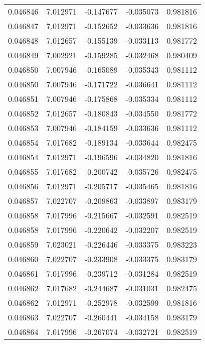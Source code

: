 \begin{tabular}{lrrrr}
0.046846    &  7.012971 & -0.147677 & -0.035073 &             0.981816 \\
0.046847    &  7.012971 & -0.152652 & -0.033636 &             0.981816 \\
0.046848    &  7.012657 & -0.155139 & -0.033113 &             0.981772 \\
0.046849    &  7.002921 & -0.159285 & -0.032468 &             0.980409 \\
0.046850    &  7.007946 & -0.165089 & -0.035343 &             0.981112 \\
0.046850    &  7.007946 & -0.171722 & -0.036641 &             0.981112 \\
0.046851    &  7.007946 & -0.175868 & -0.035334 &             0.981112 \\
0.046852    &  7.012657 & -0.180843 & -0.034550 &             0.981772 \\
0.046853    &  7.007946 & -0.184159 & -0.033636 &             0.981112 \\
0.046854    &  7.017682 & -0.189134 & -0.033644 &             0.982475 \\
0.046854    &  7.012971 & -0.196596 & -0.034820 &             0.981816 \\
0.046855    &  7.017682 & -0.200742 & -0.035726 &             0.982475 \\
0.046856    &  7.012971 & -0.205717 & -0.035465 &             0.981816 \\
0.046857    &  7.022707 & -0.209863 & -0.033897 &             0.983179 \\
0.046858    &  7.017996 & -0.215667 & -0.032591 &             0.982519 \\
0.046858    &  7.017996 & -0.220642 & -0.032207 &             0.982519 \\
0.046859    &  7.023021 & -0.226446 & -0.033375 &             0.983223 \\
0.046860    &  7.022707 & -0.233908 & -0.033375 &             0.983179 \\
0.046861    &  7.017996 & -0.239712 & -0.031284 &             0.982519 \\
0.046862    &  7.017682 & -0.244687 & -0.031031 &             0.982475 \\
0.046862    &  7.012971 & -0.252978 & -0.032599 &             0.981816 \\
0.046863    &  7.022707 & -0.260441 & -0.034158 &             0.983179 \\
0.046864    &  7.017996 & -0.267074 & -0.032721 &             0.982519 \\

\end{tabular}
